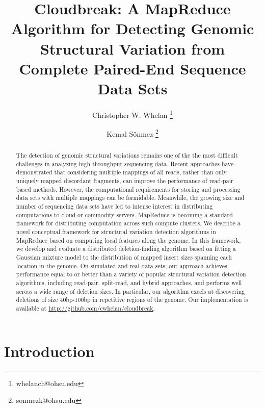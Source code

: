 \documentclass[11pt]{article}
\begin{document}
\title{Cloudbreak: A MapReduce Algorithm for Detecting Genomic Structural Variation from Complete Paired-End Sequence Data Sets}

\author[1,2,4]{Christopher W. Whelan \thanks{whelanch@ohsu.edu}}
\author[1,2,3,4]{Kemal S\"onmez \thanks{sonmezk@ohsu.edu}}


\maketitle

\begin{abstract}
The detection of genomic structural variations remains one of the the most difficult challenges in analyzing high-throughput sequencing data. Recent approaches have demonstrated that considering multiple mappings of all reads, rather than only uniquely mapped discordant fragments, can improve the performance of read-pair based methods. However, the computational requirements for storing and processing data sets with multiple mappings can be formidable. Meanwhile, the growing size and number of sequencing data sets have led to intense interest in distributing computations to cloud or commodity servers. MapReduce is becoming a standard framework for distributing computation across such compute clusters. We describe a novel conceptual framework for structural variation detection algorithms in MapReduce based on computing local features along the genome. In this framework, we develop and evaluate a distributed deletion-finding algorithm based on fitting a Gaussian mixture model to the distribution of mapped insert sizes spanning each location in the genome. On simulated and real data sets, our approach achieves performance equal to or better than a variety of popular structural variation detection algorithms, including read-pair, split-read, and hybrid approaches, and performs well across a wide range of deletion sizes. In particular, our algorithm excels at discovering deletions of size 40bp-100bp in repetitive regions of the genome. Our implementation is available at \url{http://github.com/cwhelan/cloudbreak}.
\end{abstract}

\newpage

\section{Introduction}
\end{document}
